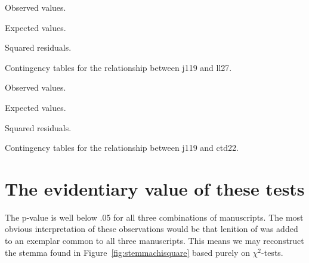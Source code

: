 \begin{table}[h]
  \centering
  \begin{subtable}[b]{0.5\linewidth}
    \centering
    \caption{Observed values.}
    \label{stab:obsj119ll27}
  \end{subtable}%
  \begin{subtable}[b]{0.5\linewidth}
    \centering
    \caption{Expected values.}
    \label{stab:expj119ll27}
  \end{subtable}
  \begin{subtable}[b]{0.5\linewidth}
    \centering
    \caption{Squared residuals.}
    \label{stab:sqresj119ll27}
  \end{subtable}
  \caption{Contingency tables for the relationship between \gls{j119} and \gls{ll27}.}
  \label{tab:continj119ll27}
\end{table}

\begin{table}[h]
  \centering
  \begin{subtable}[b]{0.5\linewidth}
    \centering
    \caption{Observed values.}
    \label{stab:obsctd22j119}
  \end{subtable}%
  \begin{subtable}[b]{0.5\linewidth}
    \centering
    \caption{Expected values.}
    \label{stab:expctd22j119}
  \end{subtable}
  \begin{subtable}[b]{0.5\linewidth}
    \centering
    \caption{Squared residuals.}
    \label{stab:sqresctd22j119}
  \end{subtable}
  \caption{Contingency tables for the relationship between \gls{j119} and \gls{ctd22}.}
  \label{tab:continctd22j119}
  \end{table}

\section{The evidentiary value of these tests}
\label{sec:evidence-from-these}

The p-value is well below .05 for all three combinations of manuscripts. The most obvious interpretation of these observations would be that lenition of  was added to an exemplar common to all three manuscripts. This means we may reconstruct the stemma found in Figure~\ref{fig:stemmachisquare} based purely on \(\chi^2\)-tests.


